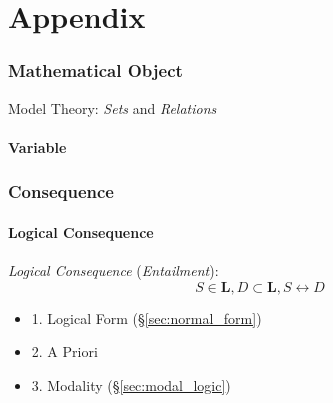 \part{Appendix}\label{sec:appendix}

\section{Mathematical Object}\label{sec:mathematical_object}

Model Theory: \emph{Sets} and \emph{Relations}



\subsection{Variable}\label{sec:variable}



\section{Consequence}\label{sec:consequence}

\subsection{Logical Consequence}\label{sec:logical_consequence}

\emph{Logical Consequence} (\emph{Entailment}):
\[
    S \in \mathbf{L}, D \subset \mathbf{L}, S \leftrightarrow D
\]
\begin{itemize}
    \item 1. Logical Form (\S\ref{sec:normal_form})
    \item 2. A Priori
    \item 3. Modality (\S\ref{sec:modal_logic})
\end{itemize}

